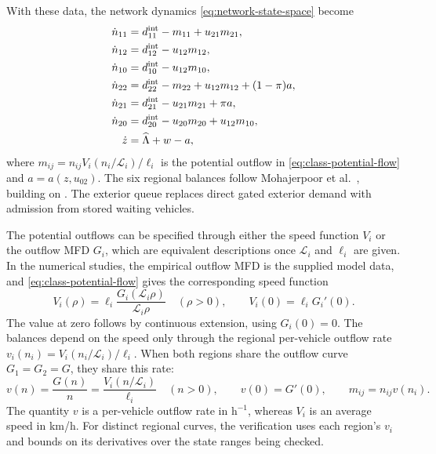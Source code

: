 \documentclass[final]{cas-sc}
\theoremstyle{definition}
\theoremstyle{plain}
\theoremstyle{definition}
\theoremstyle{plain}
\begin{document}
With these data, the network dynamics \eqref{eq:network-state-space}
become
\begin{equation}
\begin{aligned}
\dot n_{11}&=d_{11}^{\rm int}-m_{11}+u_{21}m_{21},\\
\dot n_{12}&=d_{12}^{\rm int}-u_{12}m_{12},\\
\dot n_{10}&=d_{10}^{\rm int}-u_{12}m_{10},\\
\dot n_{22}&=d_{22}^{\rm int}-m_{22}+u_{12}m_{12}+(1-\pi)a,\\
\dot n_{21}&=d_{21}^{\rm int}-u_{21}m_{21}+\pi a,\\
\dot n_{20}&=d_{20}^{\rm int}-u_{20}m_{20}+u_{12}m_{10},\\
\dot z&=\widehat\Lambda+w-a,
\end{aligned}
\label{eq:destination-class-balances}
\end{equation}
where $m_{ij}=n_{ij}V_i(n_i/\mathcal L_i)/\ell_i$ is the potential
outflow in \eqref{eq:class-potential-flow} and $a=a(z,u_{02})$. The
six regional balances follow Mohajerpoor et
al.~\cite{mohajerpoor2020hinf}, building on
\cite{geroliminis2013mpc,zhong2018robust}. The exterior queue replaces
direct gated exterior demand with admission from stored waiting
vehicles.

The potential outflows can be specified through either the speed
function $V_i$ or the outflow MFD $G_i$, which are equivalent
descriptions once $\mathcal L_i$ and $\ell_i$ are given. In the
numerical studies, the empirical outflow MFD is the supplied model
data, and \eqref{eq:class-potential-flow} gives the corresponding
speed function
\begin{equation}
V_i(\rho)=\ell_i\frac{G_i(\mathcal L_i\rho)}{\mathcal L_i\rho}
\quad(\rho>0),\qquad
V_i(0)=\ell_i G_i'(0).
\label{eq:speed-from-mfd}
\end{equation}
The value at zero follows by continuous extension, using $G_i(0)=0$.
The balances depend on the speed only through the regional
per-vehicle outflow rate $v_i(n_i)=V_i(n_i/\mathcal L_i)/\ell_i$. When
both regions share the outflow curve $G_1=G_2=G$, they share this rate:
\begin{equation}
v(n)=\frac{G(n)}{n}=\frac{V_i(n/\mathcal L_i)}{\ell_i}\quad(n>0),
\qquad v(0)=G'(0),\qquad m_{ij}=n_{ij}v(n_i).
\label{eq:per-vehicle-outflow-rate}
\end{equation}
The quantity $v$ is a per-vehicle outflow rate in h$^{-1}$, whereas
$V_i$ is an average speed in km/h. For distinct regional curves, the
verification uses each region's $v_i$ and bounds on its derivatives
over the state ranges being checked.
\end{document}
